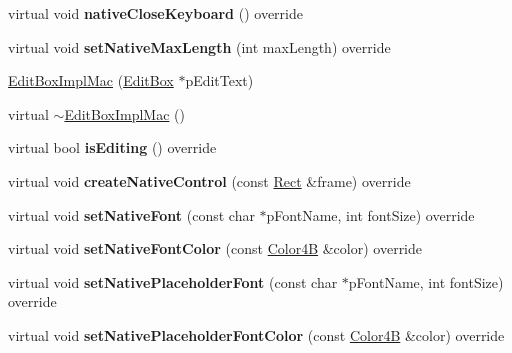 \begin{DoxyCompactItemize}
\mbox{\label{classui_1_1EditBoxImplMac_ac5155bd2c9d6a9b4517bba5ec62616b5}} 
virtual void {\bfseries native\+Close\+Keyboard} () override
\item 
\mbox{\label{classui_1_1EditBoxImplMac_adf2f5a9449d866a10b36d7329c502ad5}} 
virtual void {\bfseries set\+Native\+Max\+Length} (int max\+Length) override
\item 
\hyperlink{classui_1_1EditBoxImplMac_ab297af48ff18727aa143ffcdc72c446f}{Edit\+Box\+Impl\+Mac} (\hyperlink{classui_1_1EditBox}{Edit\+Box} $\ast$p\+Edit\+Text)
\item 
virtual \hyperlink{classui_1_1EditBoxImplMac_af961e68ef50c7912d6750b6e1bcefa0e}{$\sim$\+Edit\+Box\+Impl\+Mac} ()
\item 
\mbox{\label{classui_1_1EditBoxImplMac_a4ef5d75fce551fd4d6fb06fbf83573cf}} 
virtual bool {\bfseries is\+Editing} () override
\item 
\mbox{\label{classui_1_1EditBoxImplMac_ac6704f3a1be81e9d9f007ddd0e5fe367}} 
virtual void {\bfseries create\+Native\+Control} (const \hyperlink{classRect}{Rect} \&frame) override
\item 
\mbox{\label{classui_1_1EditBoxImplMac_a078f89aaeae1119c8d4494209ef97871}} 
virtual void {\bfseries set\+Native\+Font} (const char $\ast$p\+Font\+Name, int font\+Size) override
\item 
\mbox{\label{classui_1_1EditBoxImplMac_a2e02b198f759c8204218ed4ea4bdf060}} 
virtual void {\bfseries set\+Native\+Font\+Color} (const \hyperlink{structColor4B}{Color4B} \&color) override
\item 
\mbox{\label{classui_1_1EditBoxImplMac_a1424057296640bd5ebe6a36389c639f1}} 
virtual void {\bfseries set\+Native\+Placeholder\+Font} (const char $\ast$p\+Font\+Name, int font\+Size) override
\item 
\mbox{\label{classui_1_1EditBoxImplMac_a804b2d5df2a6c4a6dba4848b5e60d401}} 
virtual void {\bfseries set\+Native\+Placeholder\+Font\+Color} (const \hyperlink{structColor4B}{Color4B} \&color) override

\end{DoxyCompactItemize}
